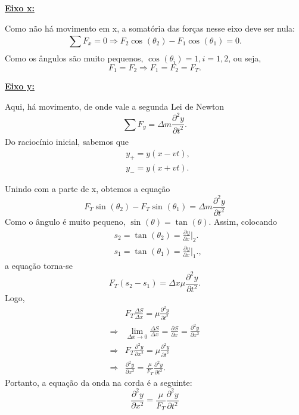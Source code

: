 \documentclass{article}
\begin{document}
\underline{\textbf{Eixo x:}}

Como não há movimento em x, a somatória das forças nesse eixo deve ser nula: 
\[
  \sum\limits_{}^{}F_{x} = 0 \Rightarrow F_{2}\cos^{}{(\theta_{2})} - F_{1}\cos^{}{(\theta_{1})} = 0.
\]
Como os ângulos são muito pequenos, \(\cos^{}{(\theta_{i})} = 1,  i=1, 2\), ou seja,
\[
  F_{1} = F_{2} \Rightarrow F_{1} = F_{2} = F_{T}.
\]

\underline{\textbf{Eixo y:}}

Aqui, há movimento, de onde vale a segunda Lei de Newton 
\[
  \sum\limits_{}^{}F_{y} = \Delta m \frac{\partial^{2}y}{\partial t^{2}}.
\]
Do raciocínio inicial, sabemos que 
\begin{align*}
  &y_{+} = y(x-vt),\\
  &y_{-} = y(x+vt).
\end{align*}

Unindo com a parte de x, obtemos a equação 
\[
  F_{T}\sin^{}{(\theta_{2})} - F_{T}\sin^{}{(\theta_{1})} = \Delta m \frac{\partial^{2}{y}}{\partial{t^{2}}}
\]
Como o ângulo é muito pequeno, \(\sin^{}{(\theta )} = \tan^{}{(\theta )}\). Assim, colocando 
\begin{align*}
   &s_{2} = \tan^{}{(\theta_{2})} = \frac{\partial^{}y}{\partial x^{}}\biggl|_{2}^{}\biggr.\\
   &s_{1} = \tan^{}{(\theta_{1})} = \frac{\partial^{}y}{\partial x^{}}\biggl|_{1}^{}\biggr.,
\end{align*}
a equação torna-se 
\[
  F_{T}(s_{2}-s_{1}) = \Delta x\mu \frac{\partial^{2}y}{\partial t^{2}}.
\]
Logo, 
\begin{align*}
  &F_{T}\frac{\Delta S}{\Delta x} = \mu \frac{\partial^{2}y}{\partial t^{2}}\\
  \Rightarrow &\lim_{\Delta x\to 0}\frac{\Delta S}{\Delta x}= \frac{\partial^{}S}{\partial x^{}}=\frac{\partial^{2}y}{\partial x^{2}}\\
  \Rightarrow &F_{T}\frac{\partial^{2}y}{\partial x^{2}}=\mu \frac{\partial^{2}y}{\partial t^{2}}\\
  \Rightarrow &\frac{\partial^{2}y}{\partial x^{2}}=\frac{\mu}{F_{T}}\frac{\partial^{2}y}{\partial t^{2}}.
\end{align*}
Portanto, a equação da onda na corda é a seguinte:
\[
  \boxed{\frac{\partial^{2}y}{\partial x^{2}}=\frac{\mu}{F_{T}}\frac{\partial^{2}y}{\partial t^{2}}}
\]
\end{document}
